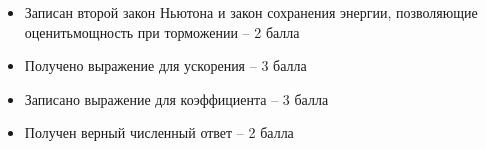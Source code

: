 \begin{enumerate}

    \markSection

    \begin{itemize}
        \item Записан второй закон Ньютона и закон сохранения энергии, позволяющие оценитьмощность при торможении – 2 балла
        \item Получено выражение для ускорения – 3 балла
        \item Записано выражение для коэффициента – 3 балла
        \item Получен верный численный ответ – 2 балла
    \end{itemize}
\end{enumerate}